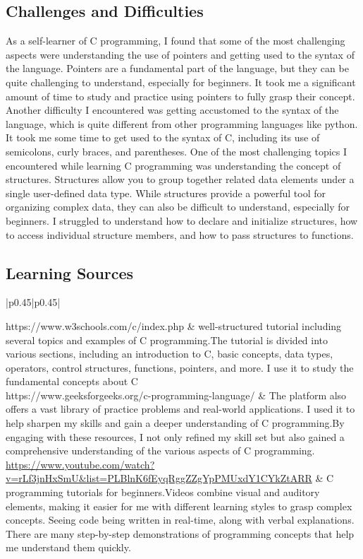 \documentclass[a4paper, 11pt]{report}
\begin{document}
\subsection{Challenges and Difficulties}
As a self-learner of C programming, I found that some of the most challenging aspects were understanding the use of pointers and getting used to the syntax of the language. Pointers are a fundamental part of the language, but they can be quite challenging to understand, especially for beginners. It took me a significant amount of time to study and practice using pointers to fully grasp their concept.
Another difficulty I encountered was getting accustomed to the syntax of the language, which is quite different from other programming languages like python. It took me some time to get used to the syntax of C, including its use of semicolons, curly braces, and parentheses.
One of the most challenging topics I encountered while learning C programming was understanding the concept of structures. Structures allow you to group together related data elements under a single user-defined data type. While structures provide a powerful tool for organizing complex data, they can also be difficult to understand, especially for beginners. I struggled to understand how to declare and initialize structures, how to access individual structure members, and how to pass structures to functions. 

\subsection{Learning Sources}


\begin{tabular}{|p{}|p{}|}
	
	\hline
	https://www.w3schools.com/c/index.php \cite{w3schools}& well-structured tutorial including several topics and examples of C programming.The tutorial is divided into various sections, including an introduction to C, basic concepts, data types, operators, control structures, functions, pointers, and more. I use it to study the fundamental concepts about C\\
	\hline
	https://www.geeksforgeeks.org/c-programming-language/ \cite{geeksforgeeks}& The platform also offers a vast library of practice problems and real-world applications. I used it to help sharpen my skills and gain a deeper understanding of C programming.By engaging with these resources, I not only refined my skill set but also gained a comprehensive understanding of the various aspects of C programming.\\
	\hline
	\url{https://www.youtube.com/watch?v=rLf3jnHxSmU&list=PLBlnK6fEyqRggZZgYpPMUxdY1CYkZtARR} \cite{youtube} & C programming tutorials for beginners.Videos combine visual and auditory elements, making it easier for me with different learning styles to grasp complex concepts. Seeing code being written in real-time, along with verbal explanations. There are many step-by-step demonstrations of programming concepts that help me understand them quickly. \\
	\hline
\end{tabular}
\end{document}
